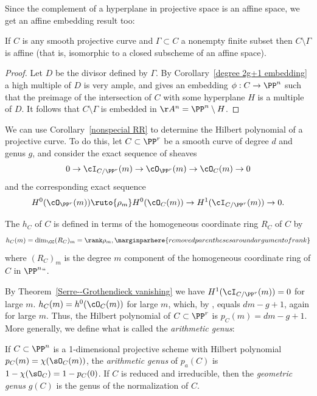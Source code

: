 Since the complement of a hyperplane in projective space is an affine space, we get an affine embedding result too:

\begin{corollary}
 If $C$ is any smooth projective curve and $\Gamma \subset C$ a nonempty finite subset then $C \setminus \Gamma$ is affine (that
 is, isomorphic to a closed subscheme of an affine space).
\end{corollary}

\begin{proof}
Let $D$ be the divisor defined by $\Gamma$. By Corollary~\ref{degree 2g+1 embedding} a high multiple of $D$ is very ample,
and gives an embedding $\phi: C\to \PP^n$ such that the preimage of the intersection of $C$ with some hyperplane $H$
is a multiple of $D$. It follows that $C\setminus \Gamma$ is embedded in $\AA^n = \PP^n\setminus H$.
\end{proof}
 
We can  use Corollary~\ref{nonspecial RR} to determine the Hilbert polynomial of a projective curve. To do this, let $C \subset \PP^r$ be a smooth curve of degree $d$ and genus $g$, and consider the exact sequence of sheaves
$$
0 \to \cI_{C/\PP^r}(m) \to \cO_{\PP^r}(m) \to \cO_C(m) \to 0
$$
and the corresponding exact sequence
$$
 H^0(\cO_{\PP^r}(m)) \ruto{\rho_m} H^0(\cO_C(m)) \to H^1(\cI_{C/\PP^r}(m)) \to 0.
$$

The  $h_C$ of $C$  is defined in terms of the
%
homogeneous coordinate ring $R_{C}$ of $C$ by
$$
h_C(m) = \dim_{\CC} (R_{C})_{m} = \rank \rho_m,
\marginparhere{removed parentheses around argument of rank}
$$
where $(R_{C})_{m}$ is the degree $m$ component of the homogeneous coordinate ring of $C$ in $\PP^n` `$.

By Theorem~\ref{Serre--Grothendieck vanishing} we have
$H^1(\cI_{C/\PP^r}(m)) = 0$ for large $m$.
$h_{C}(m) = h^0(\cO_C(m))$ for large $m$, which, by 
, equals $dm-g+1$, again for large $m$. 
Thus, the Hilbert polynomial of $C \subset \PP^r$ is $p_C(m) = dm-g+1$.  
More generally, we define what is called the \emph{arithmetic genus}:

\begin{definition}\label{genus Hilbert}\label{pa}\label{genus formula}
If $C\subset \PP^n$ is a 1-dimensional projective scheme with Hilbert polynomial
$p_C(m) = \chi(\sO_C(m))$, the \emph{arithmetic genus} of $p_a(C)$ is $1-\chi(\sO_{C}) = 1-p_C(0)$. If $C$ is reduced and irreducible, then
the \emph{geometric genus} $g(C)$ is the genus of the normalization of $C$.
\end{definition}

